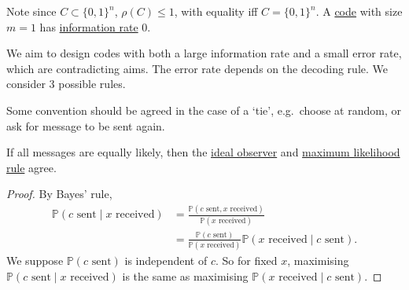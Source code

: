 \documentclass{article}
\newcommand{\Prob}{\mathbb{P}}
\newcommand{\1}[1]{\mathbbm{1}_{#1}}
\begin{document}
Note since $C\subset\{0, 1\}^n$, $\rho(C) \leq 1$, with equality iff $C = \{0, 1\}^n$.
A \hyperlink{def:binaryCode}{code} with size $m=1$ has \hyperlink{def:infoRate}{information rate} 0.

We aim to design codes with both a large information rate and a small error rate, which are contradicting aims.
The error rate depends on the decoding rule. We consider 3 possible rules.
\begin{remark}
    Some convention should be agreed in the case of a `tie', e.g.\ choose at random, or ask for message to be sent again.
\end{remark}
\begin{nlemma}\label{lem:2.1}
    If all messages are equally likely, then the \hyperlink{def:idealObserver}{ideal observer} and \hyperlink{def:maximumLikelihood}{maximum likelihood rule} agree.
\end{nlemma}
\begin{proof}
    By Bayes' rule,
    \begin{align*}
        \Prob(c \text{ sent} \mid x \text{ received}) &= \frac{\Prob(c \text{ sent}, x \text{ received})}{\Prob(x \text{ received})} \\
                                               &= \frac{\Prob(c \text{ sent})}{\Prob(x \text{ received})} \Prob(x \text{ received} \mid c \text{ sent}).
    \end{align*}
    We suppose $\Prob(c \text{ sent})$ is independent of $c$. So for fixed $x$, maximising $\Prob(c \text{ sent} \mid x \text{ received}) $ is the same as maximising $\Prob(x \text{ received} \mid c \text{ sent})$.
\end{proof}
\end{document}
